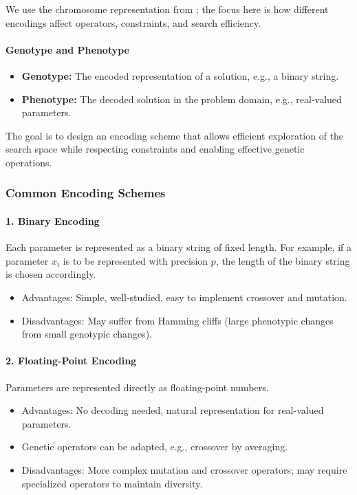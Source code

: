 We use the chromosome representation from ; the focus here is how different encodings affect operators, constraints, and search efficiency.

\paragraph{Genotype and Phenotype}
\begin{itemize}
    \item \textbf{Genotype:} The encoded representation of a solution, e.g., a binary string.
    \item \textbf{Phenotype:} The decoded solution in the problem domain, e.g., real-valued parameters.
\end{itemize}

The goal is to design an encoding scheme that allows efficient exploration of the search space while respecting constraints and enabling effective genetic operations.

\subsubsection{Common Encoding Schemes}
\label{sec:evo_common_encoding_schemes_sub}

\paragraph{1. Binary Encoding}
Each parameter is represented as a binary string of fixed length. For example, if a parameter \( x_i \) is to be represented with precision \( p \), the length of the binary string is chosen accordingly.

\begin{itemize}
    \item Advantages: Simple, well-studied, easy to implement crossover and mutation.
    \item Disadvantages: May suffer from Hamming cliffs (large phenotypic changes from small genotypic changes).
\end{itemize}

\paragraph{2. Floating-Point Encoding}
Parameters are represented directly as floating-point numbers.

\begin{itemize}
    \item Advantages: No decoding needed, natural representation for real-valued parameters.
    \item Genetic operators can be adapted, e.g., crossover by averaging.
    \item Disadvantages: More complex mutation and crossover operators; may require specialized operators to maintain diversity.
\end{itemize}

